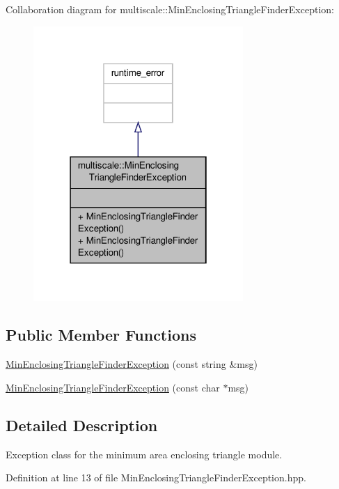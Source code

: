 Collaboration diagram for multiscale\-:\-:Min\-Enclosing\-Triangle\-Finder\-Exception\-:
\nopagebreak
\begin{figure}[H]
\begin{center}
\leavevmode
\includegraphics[width=226pt]{classmultiscale_1_1MinEnclosingTriangleFinderException__coll__graph}
\end{center}
\end{figure}
\subsection*{Public Member Functions}
\begin{DoxyCompactItemize}
\item 
\hyperlink{classmultiscale_1_1MinEnclosingTriangleFinderException_a4a83fc394b2c31092e51cb4d43f45d5e}{Min\-Enclosing\-Triangle\-Finder\-Exception} (const string \&msg)
\item 
\hyperlink{classmultiscale_1_1MinEnclosingTriangleFinderException_a21a9dd80a171daa204b58b33fd5fbd5e}{Min\-Enclosing\-Triangle\-Finder\-Exception} (const char $\ast$msg)
\end{DoxyCompactItemize}


\subsection{Detailed Description}
Exception class for the minimum area enclosing triangle module. 

Definition at line 13 of file Min\-Enclosing\-Triangle\-Finder\-Exception.\-hpp.



